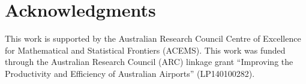\documentclass[article]{jss}
\begin{document}
\section*{Acknowledgments}

This work is supported by the Australian Research Council Centre of
Excellence for Mathematical and Statistical Frontiers (ACEMS). This
work was funded through the Australian Research Council (ARC) linkage
grant ``Improving the Productivity and Efficiency of Australian
Airports'' (LP140100282).

\newpage


\end{document}
